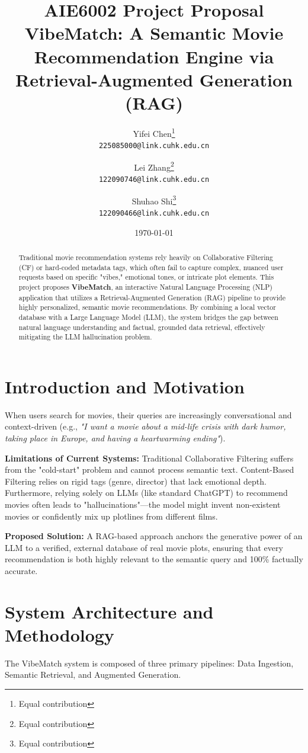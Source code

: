 \documentclass[12pt, a4paper]{article}
\title{\textbf{AIE6002 Project Proposal}\\[0.8em] 
\Large VibeMatch: A Semantic Movie Recommendation Engine via Retrieval-Augmented Generation (RAG)}
\author{%
  Yifei Chen\thanks{Equal contribution} \\
  \texttt{225085000@link.cuhk.edu.cn} \\
  \and
  Lei Zhang\thanks{Equal contribution} \\
  \texttt{122090746@link.cuhk.edu.cn} \\
  \and
  Shuhao Shi\thanks{Equal contribution} \\
  \texttt{122090466@link.cuhk.edu.cn} \\
}
\date{\today}
\begin{document}
\maketitle

\vspace{-2em}
\begin{abstract}
Traditional movie recommendation systems rely heavily on Collaborative Filtering (CF) or hard-coded metadata tags, which often fail to capture complex, nuanced user requests based on specific "vibes," emotional tones, or intricate plot elements. This project proposes \textbf{VibeMatch}, an interactive Natural Language Processing (NLP) application that utilizes a Retrieval-Augmented Generation (RAG) pipeline to provide highly personalized, semantic movie recommendations. By combining a local vector database with a Large Language Model (LLM), the system bridges the gap between natural language understanding and factual, grounded data retrieval, effectively mitigating the LLM hallucination problem.
\end{abstract}

\section{Introduction and Motivation}
When users search for movies, their queries are increasingly conversational and context-driven (e.g., \textit{"I want a movie about a mid-life crisis with dark humor, taking place in Europe, and having a heartwarming ending"}). 

\textbf{Limitations of Current Systems:} Traditional Collaborative Filtering suffers from the "cold-start" problem and cannot process semantic text. Content-Based Filtering relies on rigid tags (genre, director) that lack emotional depth. Furthermore, relying solely on LLMs (like standard ChatGPT) to recommend movies often leads to "hallucinations"—the model might invent non-existent movies or confidently mix up plotlines from different films. 

\textbf{Proposed Solution:} A RAG-based approach anchors the generative power of an LLM to a verified, external database of real movie plots, ensuring that every recommendation is both highly relevant to the semantic query and 100\% factually accurate.

\section{System Architecture and Methodology}
The VibeMatch system is composed of three primary pipelines: Data Ingestion, Semantic Retrieval, and Augmented Generation.
\end{document}
